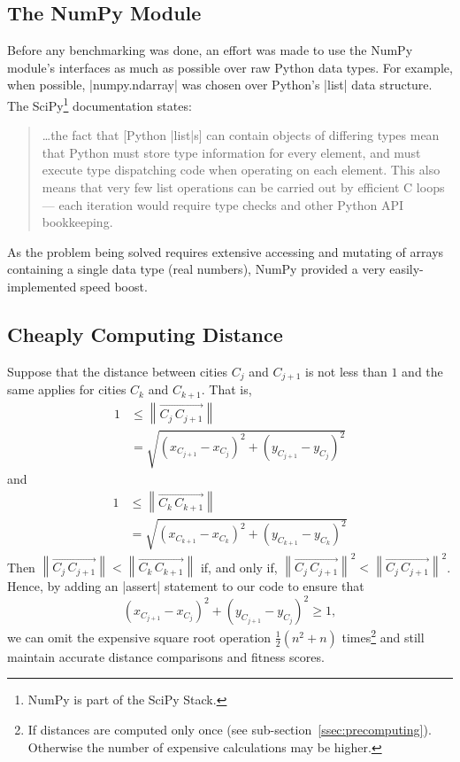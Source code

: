 \subsection{The NumPy Module}
Before any benchmarking was done, an effort was made to use the 
NumPy \cite{numpy} module's interfaces as much as possible over raw 
Python data types. For example, when possible, |numpy.ndarray| was 
chosen over Python's |list| data structure. The SciPy\footnote{NumPy is
part of the SciPy Stack.} documentation states:
\begin{quote}
	 \ldots the fact that [Python |list|s] can contain objects of differing 
	 types mean that Python must store type information for every 
	 element, and must execute type dispatching code when operating 
	 on each element. This also means that very few list operations can 
	 be carried out by efficient C loops --- each iteration would require 
	 type checks and other Python API bookkeeping. \cite{scipy_docs}
\end{quote}
As the problem being solved requires extensive accessing and mutating
of arrays containing a single data type (\ie real numbers), NumPy 
provided a very easily-implemented speed boost.

\subsection{Cheaply Computing Distance}
Suppose that the distance between cities $C_j$ and $C_{j+1}$ is not less
 than $1$ and the same applies for cities $C_k$ and $C_{k+1}$. That is, 
\begin{align*}
\textstyle 1 &\leqslant \left\lVert \overrightarrow{C_j \, C_{j+1}} \right\rVert \\
&= \sqrt{(x_{C_{j+1}} - x_{C_j})^2 + (y_{C_{j+1}} - y_{C_j})^2}
\end{align*}
and
\begin{align*}
\textstyle 1 &\leqslant \left\lVert \overrightarrow{C_k\, C_{k+1}} \right\rVert \\
&= \sqrt{(x_{C_{k+1}} - x_{C_k})^2 + (y_{C_{k+1}} - y_{C_k})^2}
\end{align*}
Then 
$\left\lVert \overrightarrow{C_j\, C_{j+1}} \right\rVert < \left\lVert \overrightarrow{C_k\, C_{k+1}} \right\rVert$ 
if, and only if, 
$\left\lVert \overrightarrow{C_j\, C_{j+1}} \right\rVert^2 < \left\lVert \overrightarrow{C_j\, C_{j+1}} \right\rVert^2$.
Hence, by adding an |assert| statement to our code to ensure that 
\begin{equation*}
(x_{C_{j+1}} - x_{C_j})^2 + (y_{C_{j+1}} - y_{C_j})^2 \geqslant 1,
\end{equation*}
we can omit the expensive square root operation $\frac{1}{2}(n^2 + n)$ 
times\footnote{If distances are computed only once (see
sub-section~\ref{ssec:precomputing}). Otherwise the number of expensive
calculations may be higher.} and still maintain accurate distance 
comparisons and fitness scores. 

